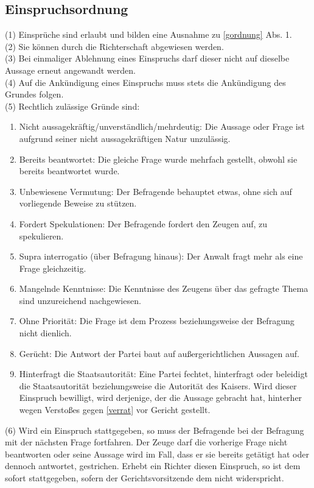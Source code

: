 \documentclass{article}
\begin{document}
\subsection{Einspruchsordnung}\label{eordnung}
(1) Einsprüche sind erlaubt und bilden eine Ausnahme zu \ref{gordnung} Abs. 1.\\
(2) Sie können durch die Richterschaft abgewiesen werden.\\
(3) Bei einmaliger Ablehnung eines Einspruchs darf dieser nicht auf dieselbe Aussage erneut angewandt werden.\\
(4) Auf die Ankündigung eines Einspruchs muss stets die Ankündigung des Grundes folgen.\\
(5) Rechtlich zulässige Gründe sind:
\begin{enumerate}
\item Nicht aussagekräftig/unverständlich/mehrdeutig: Die Aussage oder Frage ist aufgrund seiner nicht aussagekräftigen Natur unzulässig.
\item Bereits beantwortet: Die gleiche Frage wurde mehrfach gestellt, obwohl sie bereits beantwortet wurde.
\item Unbewiesene Vermutung: Der Befragende behauptet etwas, ohne sich auf vorliegende Beweise zu stützen.
\item Fordert Spekulationen: Der Befragende fordert den Zeugen auf, zu spekulieren.
\item Supra interrogatio (über Befragung hinaus): Der Anwalt fragt mehr als eine Frage gleichzeitig.
\item Mangelnde Kenntnisse: Die Kenntnisse des Zeugens über das gefragte Thema sind unzureichend nachgewiesen.
\item Ohne Priorität: Die Frage ist dem Prozess beziehungsweise der Befragung nicht dienlich.
\item Gerücht: Die Antwort der Partei baut auf außergerichtlichen Aussagen auf.
\item Hinterfragt die Staatsautorität: Eine Partei fechtet, hinterfragt oder beleidigt die Staatsautorität beziehungsweise die Autorität des Kaisers. Wird dieser Einspruch bewilligt, wird derjenige, der die Aussage gebracht hat, hinterher wegen Verstoßes gegen \ref{verrat} vor Gericht gestellt.
\end{enumerate}
(6) Wird ein Einspruch stattgegeben, so muss der Befragende bei der Befragung mit der nächsten Frage fortfahren. Der Zeuge darf die vorherige Frage nicht beantworten oder seine Aussage wird im Fall, dass er sie bereits getätigt hat oder dennoch antwortet, gestrichen. Erhebt ein Richter diesen Einspruch, so ist dem sofort stattgegeben, sofern der Gerichtsvorsitzende dem nicht widerspricht.
\end{document}
